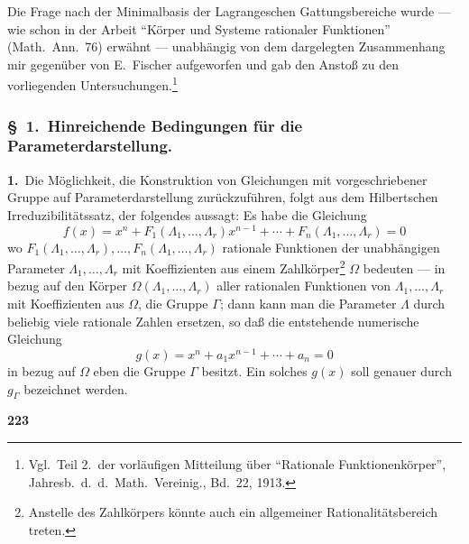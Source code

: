 \documentclass[12pt,a4paper]{article}
\begin{document}
Die Frage nach der Minimalbasis der Lagrangeschen Gattungsbereiche wurde --- wie schon in der Arbeit ``K\"orper und Systeme rationaler Funktionen'' (Math.\ Ann.\ 76) erw\"ahnt --- unabh\"angig von dem dargelegten Zusammenhang mir gegen\"uber von E.\ Fischer aufgeworfen und gab den Ansto\ss{} zu den vorliegenden Untersuchungen.\footnote{Vgl.\ Teil 2.\ der vorl\"aufigen Mitteilung \"uber ``Rationale Funktionenk\"orper'', Jahresb.\ d.\ d.\ Math.\ Vereinig., Bd.\ 22, 1913.}

\subsubsection*{\S\ 1.\ Hinreichende Bedingungen f\"ur die Parameterdarstellung.}

\textbf{1.}\ Die M\"oglichkeit, die Konstruktion von Gleichungen mit vorgeschriebener Gruppe auf Parameterdarstellung zur\"uckzuf\"uhren, folgt aus dem Hilbertschen Irreduzibilit\"atssatz, der folgendes aussagt: Es habe die Gleichung
\begin{equation}\tag{1}
f(x) = x^n + F_1(\Lambda_1, \ldots, \Lambda_r) x^{n-1} + \cdots + F_n(\Lambda_1, \ldots, \Lambda_r) = 0
\end{equation}
wo $F_1(\Lambda_1, \ldots, \Lambda_r), \ldots, F_n(\Lambda_1, \ldots, \Lambda_r)$ rationale Funktionen der unabh\"angigen Parameter $\Lambda_1, \ldots, \Lambda_r$ mit Koeffizienten aus einem Zahlk\"orper\footnote{Anstelle des Zahlk\"orpers k\"onnte auch ein allgemeiner Rationalit\"atsbereich treten.} $\Omega$ bedeuten --- in bezug auf den K\"orper $\Omega(\Lambda_1, \ldots, \Lambda_r)$ aller rationalen Funktionen von $\Lambda_1, \ldots, \Lambda_r$ mit Koeffizienten aus $\Omega$, die Gruppe $\Gamma$; dann kann man die Parameter $\Lambda$ durch beliebig viele rationale Zahlen ersetzen, so da\ss{} die entstehende numerische Gleichung
\begin{equation}\tag{2}
g(x) = x^n + a_1 x^{n-1} + \cdots + a_n = 0
\end{equation}
in bezug auf $\Omega$ eben die Gruppe $\Gamma$ besitzt. Ein solches $g(x)$ soll genauer durch $g_{\Gamma}$ bezeichnet werden.

\newpage
\begin{center}
\textbf{223}
\end{center}
\end{document}

